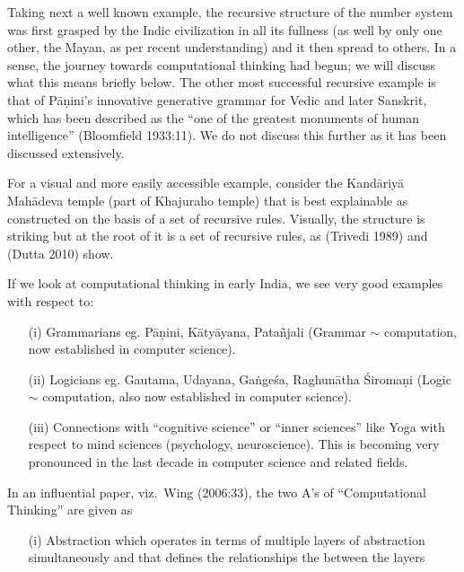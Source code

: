 {Taking next a well known example, the recursive structure of the number system was first grasped by the Indic civilization in all its fullness (as well by only one other, the Mayan, as per recent understanding) and it then spread to others. In a sense, the journey towards computational thinking had begun; we will discuss what this means briefly below. The other most successful recursive example is that of Pāṇini’s innovative generative grammar for Vedic and later Sanskrit, which has been described as the “one of the greatest monuments of human intelligence” (Bloomfield 1933:11). We do not discuss this further as it has been discussed extensively.

For a visual and more easily accessible example, consider the Kandāriyā Mahādeva temple (part of Khajuraho temple) that is best explainable as constructed on the basis of a set of recursive rules. Visually, the structure is striking but at the root of it is a set of recursive rules, as (Trivedi 1989) and (Dutta 2010) show.

If we look at computational thinking in early India, we see very good examples with respect to:
\begin{itemize}
\itemsep=2pt
\item[(i)] Grammarians eg. Pāṇini, Kātyāyana, Patañjali (Grammar $\sim$ computation, now established in computer science).

\item[(ii)] Logicians eg. Gautama, Udayana, Gaṅgeśa, Raghunātha Śiromaṇi (Logic $\sim$ computation, also now established in computer science).

\item[(iii)] Connections with “cognitive science” or “inner sciences” like Yoga with respect to mind sciences (psychology, neuroscience). This is becoming very pronounced in the last decade in computer science and related fields.
\end{itemize}

In an influential paper, viz.~Wing (2006:33), the two A’s of “Computational Thinking” are given as 
\begin{itemize}
\itemsep=2pt
\item[(i)] Abstraction which operates in terms of multiple layers of abstraction simultaneously and that defines the relationships the between the layers


\end{itemize}}
